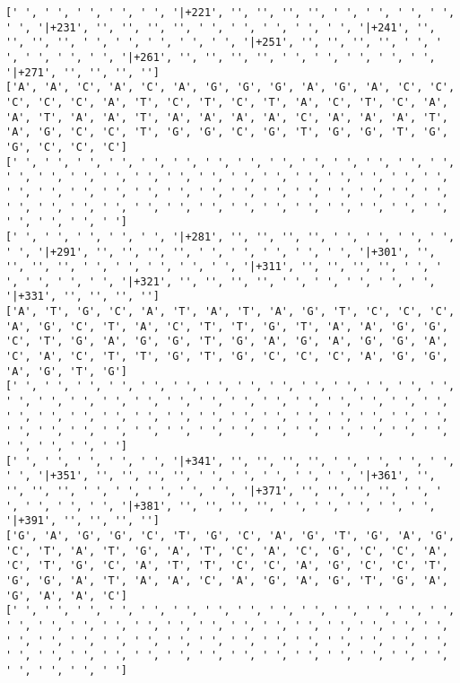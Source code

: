 \documentclass{article}
\begin{document}
\begin{Verbatim}
[' ', ' ', ' ', ' ', ' ', '|+221', '', '', '', '', ' ', ' ', ' ', ' ', ' ', '|+231', '', '', '', '', ' ', ' ', ' ', ' ', ' ', '|+241', '', '', '', '', ' ', ' ', ' ', ' ', ' ', '|+251', '', '', '', '', ' ', ' ', ' ', ' ', ' ', '|+261', '', '', '', '', ' ', ' ', ' ', ' ', ' ', '|+271', '', '', '', '']
['A', 'A', 'C', 'A', 'C', 'A', 'G', 'G', 'G', 'A', 'G', 'A', 'C', 'C', 'C', 'C', 'C', 'A', 'T', 'C', 'T', 'C', 'T', 'A', 'C', 'T', 'C', 'A', 'A', 'T', 'A', 'A', 'T', 'A', 'A', 'A', 'A', 'C', 'A', 'A', 'A', 'T', 'A', 'G', 'C', 'C', 'T', 'G', 'G', 'C', 'G', 'T', 'G', 'G', 'T', 'G', 'G', 'C', 'C', 'C']
[' ', ' ', ' ', ' ', ' ', ' ', ' ', ' ', ' ', ' ', ' ', ' ', ' ', ' ', ' ', ' ', ' ', ' ', ' ', ' ', ' ', ' ', ' ', ' ', ' ', ' ', ' ', ' ', ' ', ' ', ' ', ' ', ' ', ' ', ' ', ' ', ' ', ' ', ' ', ' ', ' ', ' ', ' ', ' ', ' ', ' ', ' ', ' ', ' ', ' ', ' ', ' ', ' ', ' ', ' ', ' ', ' ', ' ', ' ', ' ']
[' ', ' ', ' ', ' ', ' ', '|+281', '', '', '', '', ' ', ' ', ' ', ' ', ' ', '|+291', '', '', '', '', ' ', ' ', ' ', ' ', ' ', '|+301', '', '', '', '', ' ', ' ', ' ', ' ', ' ', '|+311', '', '', '', '', ' ', ' ', ' ', ' ', ' ', '|+321', '', '', '', '', ' ', ' ', ' ', ' ', ' ', '|+331', '', '', '', '']
['A', 'T', 'G', 'C', 'A', 'T', 'A', 'T', 'A', 'G', 'T', 'C', 'C', 'C', 'A', 'G', 'C', 'T', 'A', 'C', 'T', 'T', 'G', 'T', 'A', 'A', 'G', 'G', 'C', 'T', 'G', 'A', 'G', 'G', 'T', 'G', 'A', 'G', 'A', 'G', 'G', 'A', 'C', 'A', 'C', 'T', 'T', 'G', 'T', 'G', 'C', 'C', 'C', 'A', 'G', 'G', 'A', 'G', 'T', 'G']
[' ', ' ', ' ', ' ', ' ', ' ', ' ', ' ', ' ', ' ', ' ', ' ', ' ', ' ', ' ', ' ', ' ', ' ', ' ', ' ', ' ', ' ', ' ', ' ', ' ', ' ', ' ', ' ', ' ', ' ', ' ', ' ', ' ', ' ', ' ', ' ', ' ', ' ', ' ', ' ', ' ', ' ', ' ', ' ', ' ', ' ', ' ', ' ', ' ', ' ', ' ', ' ', ' ', ' ', ' ', ' ', ' ', ' ', ' ', ' ']
[' ', ' ', ' ', ' ', ' ', '|+341', '', '', '', '', ' ', ' ', ' ', ' ', ' ', '|+351', '', '', '', '', ' ', ' ', ' ', ' ', ' ', '|+361', '', '', '', '', ' ', ' ', ' ', ' ', ' ', '|+371', '', '', '', '', ' ', ' ', ' ', ' ', ' ', '|+381', '', '', '', '', ' ', ' ', ' ', ' ', ' ', '|+391', '', '', '', '']
['G', 'A', 'G', 'G', 'C', 'T', 'G', 'C', 'A', 'G', 'T', 'G', 'A', 'G', 'C', 'T', 'A', 'T', 'G', 'A', 'T', 'C', 'A', 'C', 'G', 'C', 'C', 'A', 'C', 'T', 'G', 'C', 'A', 'T', 'T', 'C', 'C', 'A', 'G', 'C', 'C', 'T', 'G', 'G', 'A', 'T', 'A', 'A', 'C', 'A', 'G', 'A', 'G', 'T', 'G', 'A', 'G', 'A', 'A', 'C']
[' ', ' ', ' ', ' ', ' ', ' ', ' ', ' ', ' ', ' ', ' ', ' ', ' ', ' ', ' ', ' ', ' ', ' ', ' ', ' ', ' ', ' ', ' ', ' ', ' ', ' ', ' ', ' ', ' ', ' ', ' ', ' ', ' ', ' ', ' ', ' ', ' ', ' ', ' ', ' ', ' ', ' ', ' ', ' ', ' ', ' ', ' ', ' ', ' ', ' ', ' ', ' ', ' ', ' ', ' ', ' ', ' ', ' ', ' ', ' ']

\end{Verbatim}
\end{document}
